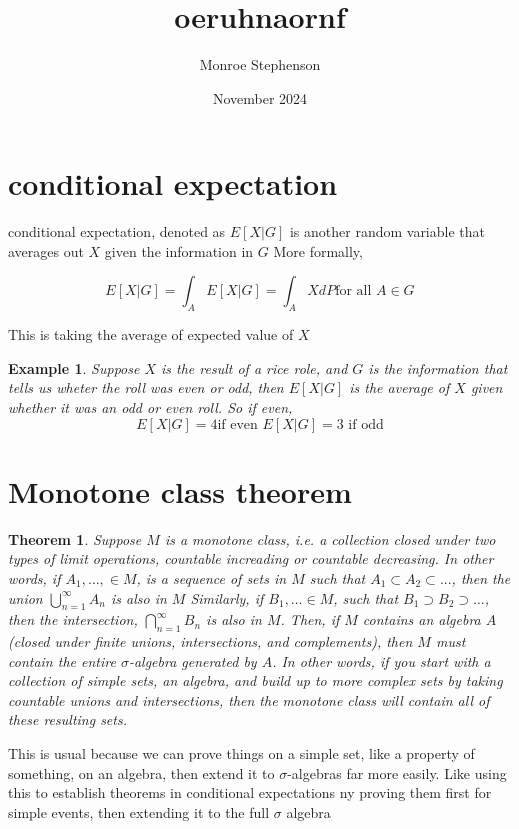 \documentclass{article}
\title{oeruhnaornf}
\author{Monroe Stephenson}
\date{November 2024}
\newtheorem{example}{Example}
\newtheorem{theorem}{Theorem}
\begin{document}
\maketitle

\section{conditional expectation}
conditional expectation, denoted as $E[X| G]$ is another random variable that averages out $X$ given the information in $G$
More formally, 

$$E[X| G]= \int_A E[X| G] = \int_A X dP \text{for all }A\in G$$

This is taking the average of expected value of $X$

\begin{example}
    Suppose $X$ is the result of a rice role, and $G$ is the information that tells us wheter the roll was even or odd, then $E[X|G]$ is the average of $X$ given whether it was an odd or even roll. So if even, 
    $$E[X|G]=4 \text{if even }E[X|G]=3\text{ if odd}$$ 
\end{example}
\section[short]{Monotone class theorem}
\begin{theorem}
    Suppose $M$ is a monotone class, i.e. a collection closed under two types of limit operations, countable increading or countable decreasing. 
    In other words, if $A_1,\hdots, \in M$, is a sequence of sets in $M$ such that $A_1\subset A_2 \subset ...$, then the union $\bigcup_{n=1}^\infty A_n$ is also in $M$
    Similarly, if $B_1, \hdots \in M$, such that $B_1 \supset B_2\supset\hdots$, then the intersection, $\bigcap_{n=1}^\infty B_n$ is also in $M$.
    Then, if $M$ contains an algebra $A$ (closed under finite unions, intersections, and complements), then $M$ must contain the entire $\sigma$-algebra generated by $A$. In other words, if you start with a collection of simple sets, an algebra, and build up to more complex sets by taking countable unions and intersections, then the monotone class will contain all of these resulting sets.
\end{theorem}
This is usual because we can prove things on a simple set, like a property of something, on an algebra, then extend it to $\sigma$-algebras far more easily. Like using this to establish theorems in conditional expectations ny proving them first for simple events, then extending it to the full $\sigma$ algebra
\end{document}
